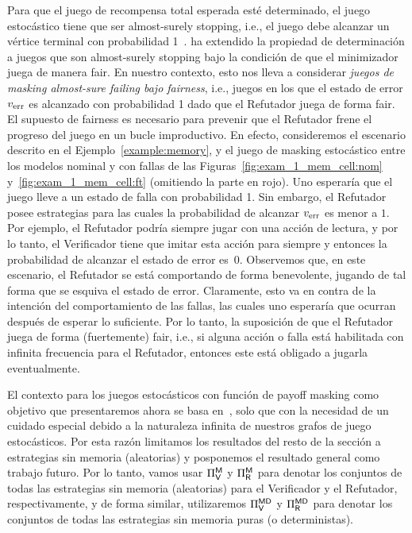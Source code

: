Para que el juego de recompensa total esperada esté determinado, el juego estocástico tiene que ser almost-surely stopping, i.e., el juego debe alcanzar un vértice terminal con probabilidad
1~\cite{FilarV96}.  \cite{CastroDDP22} ha extendido la propiedad de determinación a juegos que son almost-surely stopping bajo la condición de que el minimizador juega de manera fair.
%
En nuestro contexto, esto nos lleva a considerar \emph{juegos de masking almost-sure failing bajo fairness}, i.e., juegos en los que el estado de error
$v_{\text{err}}$ es alcanzado con probabilidad 1 dado que el Refutador juega de forma fair.
%
El supuesto de fairness es necesario para prevenir que el Refutador frene el progreso del juego en un bucle improductivo.
%
En efecto, consideremos el escenario descrito en el Ejemplo~\ref{example:memory}, y el juego de masking estocástico entre los modelos nominal y con fallas de las Figuras~\ref{fig:exam_1_mem_cell:nom} y~\ref{fig:exam_1_mem_cell:ft} (omitiendo la parte en rojo).
Uno esperaría que el juego lleve a un estado de falla con probabilidad 1.
Sin embargo, el Refutador posee estrategias para las cuales la probabilidad de alcanzar $v_{\text{err}}$ es menor a $1$.  Por ejemplo, el Refutador podría siempre jugar con una acción de lectura, y por lo tanto, el Verificador tiene que imitar esta acción para siempre y entonces la probabilidad de alcanzar el estado de error es~0.
%
Observemos que, en este escenario, el Refutador se está comportando de forma benevolente, jugando de tal forma que se esquiva el estado de error.
Claramente, esto va en contra de la intención del comportamiento de las fallas, las cuales uno esperaría que ocurran después de esperar lo suficiente.
%
Por lo tanto, la suposición de que el Refutador juega de forma (fuertemente) fair, i.e., 
si alguna acción o falla está habilitada con infinita frecuencia para el Refutador, entonces este está obligado a jugarla eventualmente.

El contexto para los juegos estocásticos con función de payoff masking como objetivo que presentaremos ahora se basa en~\cite{CastroDDP22}, solo que con la necesidad de un cuidado especial debido a la naturaleza infinita de nuestros grafos de juego estocásticos.
%
Por esta razón limitamos los resultados del resto de la sección a estrategias sin memoria (aleatorias) y posponemos el resultado general como trabajo futuro.
%
Por lo tanto, vamos usar $\Pi_{\mathsf{V}}^{\mathsf{M}}$ y
$\Pi_{\mathsf{R}}^{\mathsf{M}}$ para denotar los conjuntos de todas las estrategias sin memoria (aleatorias) para el Verificador y el Refutador,
respectivamente, y de forma similar, utilizaremos
$\Pi_{\mathsf{V}}^{\mathsf{M}\mathsf{D}}$ y
$\Pi_{\mathsf{R}}^{\mathsf{M}\mathsf{D}}$ para denotar los conjuntos de todas las estrategias sin memoria puras (o deterministas).


